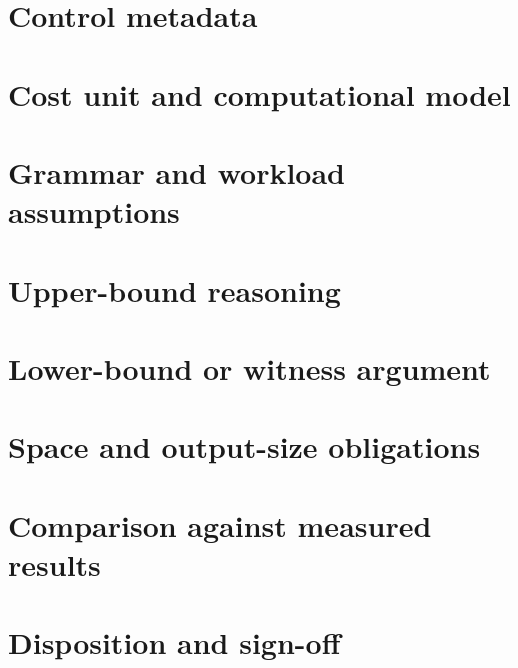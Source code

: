 \documentclass[11pt,letterpaper]{article}
\begin{document}
\makedoctitle\makedocsummary
\section{Control metadata}
\section{Cost unit and computational model}
\section{Grammar and workload assumptions}
\section{Upper-bound reasoning}
\section{Lower-bound or witness argument}
\section{Space and output-size obligations}
\section{Comparison against measured results}
\section{Disposition and sign-off}
\end{document}

